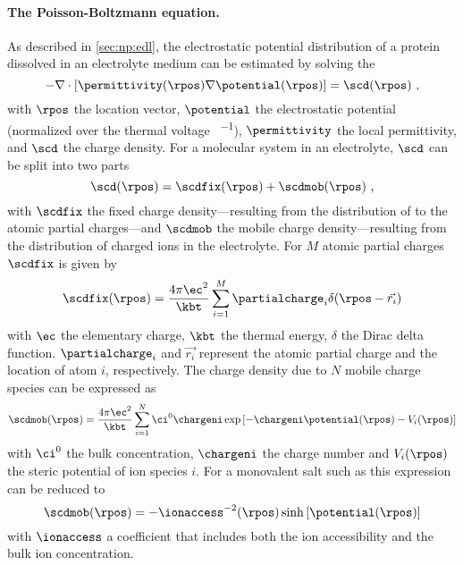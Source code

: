 \paragraph{The Poisson-Boltzmann equation.}
%
As described in \cref{sec:np:edl}, the electrostatic potential distribution of a protein dissolved in an
electrolyte medium can be estimated by solving the ~\cite{Baker-2001,Baker-2005}
%
\begin{equation}\label{eq:pbe}
  - \nabla \cdot \left[ \permittivity (\rpos) \nabla \potential (\rpos) \right] = \scd (\rpos)
  \text{ ,}
\end{equation}
%
with $\rpos$ the location vector, $\potential$ the electrostatic potential (normalized over the thermal
voltage \si{\kT\per\ec}), $\permittivity$ the local permittivity, and $\scd$ the charge density. For a
molecular system in an electrolyte, $\scd$ can be split into two parts
%
\begin{equation}\label{eq:electrostatics_scd}
  \scd (\rpos) = \scdfix(\rpos) + \scdmob(\rpos)
  \text{ ,}
\end{equation}
%
with $\scdfix$ the fixed charge density---resulting from the distribution of to the atomic partial
charges---and $\scdmob$ the mobile charge density---resulting from the distribution of charged ions in the
electrolyte. For $M$ atomic partial charges $\scdfix$ is given by~\cite{Baker-2001,Baker-2005}
%
\begin{equation}\label{eq:electrostatics_scdf}
  \scdfix (\rpos) = \dfrac{4\pi\ec^2}{\kbt} \sum_{i=1}^{M} \partialcharge_i \delta(\rpos - \vec{r_i})
\end{equation}
%
with $\ec$ the elementary charge, $\kbt$ the thermal energy, $\delta$ the Dirac delta function.
$\partialcharge_i$ and $\vec{r_i}$ represent the atomic partial charge and the location of atom $i$,
respectively. The charge density due to $N$ mobile charge species can be expressed
as~\cite{Baker-2001,Baker-2005}
%
\begin{equation}\label{eq:electrostatics_scdm}
  \scdmob(\rpos) =
    \dfrac{4\pi\ec^2}{\kbt}
      \sum_{i=1}^{N} \ci^0 \chargeni
      \exp{\left[- \chargeni \potential(\rpos) - V_i(\rpos) \right]}
\end{equation}
%
with $\ci^0$ the bulk concentration, $\chargeni$ the charge number and $V_i(\rpos)$ the steric potential of
ion species $i$. For a monovalent salt such as  this expression can be reduced to
%
\begin{equation}\label{eq:electrostatics_scdm_salt}
    \scdmob (\rpos) = - \ionaccess^{-2} (\rpos) \sinh \left[ \potential (\rpos) \right]
\end{equation}
%
with $\ionaccess$ a coefficient that includes both the ion accessibility and the bulk ion concentration.

